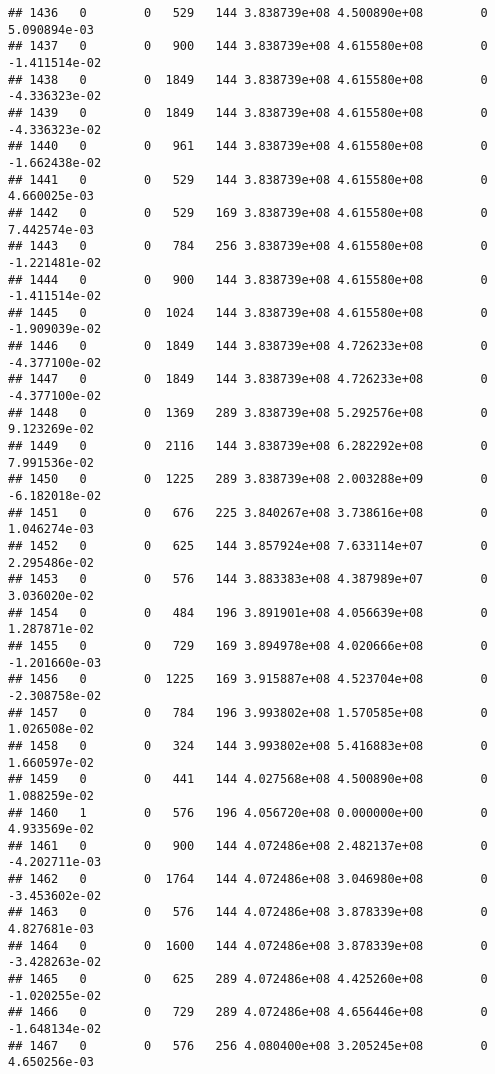 \documentclass[
]{article}
\begin{document}
\begin{enumerate}
\begin{verbatim}
## 1436   0        0   529   144 3.838739e+08 4.500890e+08        0  5.090894e-03
## 1437   0        0   900   144 3.838739e+08 4.615580e+08        0 -1.411514e-02
## 1438   0        0  1849   144 3.838739e+08 4.615580e+08        0 -4.336323e-02
## 1439   0        0  1849   144 3.838739e+08 4.615580e+08        0 -4.336323e-02
## 1440   0        0   961   144 3.838739e+08 4.615580e+08        0 -1.662438e-02
## 1441   0        0   529   144 3.838739e+08 4.615580e+08        0  4.660025e-03
## 1442   0        0   529   169 3.838739e+08 4.615580e+08        0  7.442574e-03
## 1443   0        0   784   256 3.838739e+08 4.615580e+08        0 -1.221481e-02
## 1444   0        0   900   144 3.838739e+08 4.615580e+08        0 -1.411514e-02
## 1445   0        0  1024   144 3.838739e+08 4.615580e+08        0 -1.909039e-02
## 1446   0        0  1849   144 3.838739e+08 4.726233e+08        0 -4.377100e-02
## 1447   0        0  1849   144 3.838739e+08 4.726233e+08        0 -4.377100e-02
## 1448   0        0  1369   289 3.838739e+08 5.292576e+08        0  9.123269e-02
## 1449   0        0  2116   144 3.838739e+08 6.282292e+08        0  7.991536e-02
## 1450   0        0  1225   289 3.838739e+08 2.003288e+09        0 -6.182018e-02
## 1451   0        0   676   225 3.840267e+08 3.738616e+08        0  1.046274e-03
## 1452   0        0   625   144 3.857924e+08 7.633114e+07        0  2.295486e-02
## 1453   0        0   576   144 3.883383e+08 4.387989e+07        0  3.036020e-02
## 1454   0        0   484   196 3.891901e+08 4.056639e+08        0  1.287871e-02
## 1455   0        0   729   169 3.894978e+08 4.020666e+08        0 -1.201660e-03
## 1456   0        0  1225   169 3.915887e+08 4.523704e+08        0 -2.308758e-02
## 1457   0        0   784   196 3.993802e+08 1.570585e+08        0  1.026508e-02
## 1458   0        0   324   144 3.993802e+08 5.416883e+08        0  1.660597e-02
## 1459   0        0   441   144 4.027568e+08 4.500890e+08        0  1.088259e-02
## 1460   1        0   576   196 4.056720e+08 0.000000e+00        0  4.933569e-02
## 1461   0        0   900   144 4.072486e+08 2.482137e+08        0 -4.202711e-03
## 1462   0        0  1764   144 4.072486e+08 3.046980e+08        0 -3.453602e-02
## 1463   0        0   576   144 4.072486e+08 3.878339e+08        0  4.827681e-03
## 1464   0        0  1600   144 4.072486e+08 3.878339e+08        0 -3.428263e-02
## 1465   0        0   625   289 4.072486e+08 4.425260e+08        0 -1.020255e-02
## 1466   0        0   729   289 4.072486e+08 4.656446e+08        0 -1.648134e-02
## 1467   0        0   576   256 4.080400e+08 3.205245e+08        0  4.650256e-03

\end{verbatim}
\end{enumerate}
\end{document}
